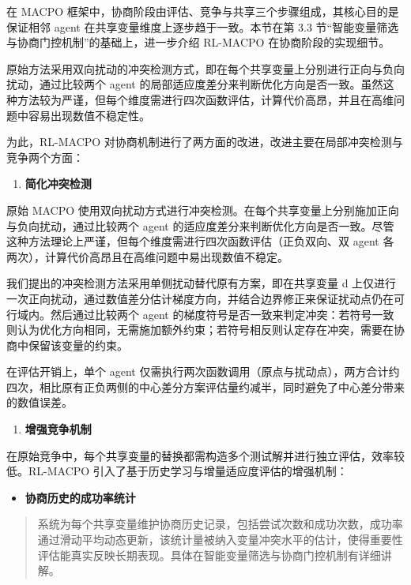 \documentclass[12pt]{ctexart}
\begin{document}
在 MACPO
框架中，协商阶段由评估、竞争与共享三个步骤组成，其核心目的是保证相邻
agent 在共享变量维度上逐步趋于一致。本节在第 3.3
节``智能变量筛选与协商门控机制''的基础上，进一步介绍 RL-MACPO
在协商阶段的实现细节。

原始方法采用双向扰动的冲突检测方式，即在每个共享变量上分别进行正向与负向扰动，通过比较两个
agent
的局部适应度差分来判断优化方向是否一致。虽然这种方法较为严谨，但每个维度需进行四次函数评估，计算代价高昂，并且在高维问题中容易出现数值不稳定性。

为此，RL-MACPO
对协商机制进行了两方面的改进，改进主要在局部冲突检测与竞争两个方面：

\begin{enumerate}
\def\labelenumi{(\arabic{enumi})}
\item
  \textbf{简化冲突检测}
\end{enumerate}

原始 MACPO
使用双向扰动方式进行冲突检测。在每个共享变量上分别施加正向与负向扰动，通过比较两个
agent
的适应度差分来判断优化方向是否一致。尽管这种方法理论上严谨，但每个维度需进行四次函数评估（正负双向、双
agent 各两次），计算代价高昂且在高维问题中易出现数值不稳定。

我们提出的冲突检测方法采用单侧扰动替代原有方案，即在共享变量 d
上仅进行一次正向扰动，通过数值差分估计梯度方向，并结合边界修正来保证扰动点仍在可行域内。然后通过比较两个
agent
的梯度符号是否一致来判定冲突：若符号一致则认为优化方向相同，无需施加额外约束；若符号相反则认定存在冲突，需要在协商中保留该变量的约束。

在评估开销上，单个 agent
仅需执行两次函数调用（原点与扰动点），两方合计约四次，相比原有正负两侧的中心差分方案评估量约减半，同时避免了中心差分带来的数值误差。

\begin{enumerate}
\def\labelenumi{(\arabic{enumi})}
\setcounter{enumi}{1}
\item
  \textbf{增强竞争机制}
\end{enumerate}

在原始竞争中，每个共享变量的替换都需构造多个测试解并进行独立评估，效率较低。RL-MACPO
引入了基于历史学习与增量适应度评估的增强机制：

\begin{itemize}
\item
  \textbf{协商历史的成功率统计}
\end{itemize}

\begin{quote}
系统为每个共享变量维护协商历史记录，包括尝试次数和成功次数，成功率通过滑动平均动态更新，该统计量被纳入变量冲突水平的估计，使得重要性评估能真实反映长期表现。具体在智能变量筛选与协商门控机制有详细讲解。
\end{quote}
\end{document}
